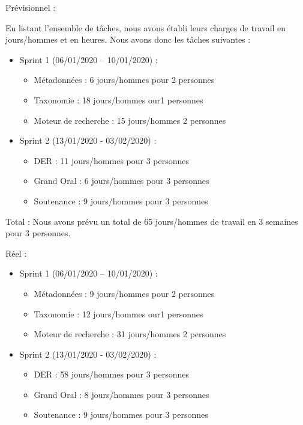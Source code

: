 Prévisionnel : 

En listant l’ensemble de tâches, nous avons établi leurs charges de travail en jours/hommes et en heures. 
Nous avons donc les tâches suivantes : 

\begin{itemize}
    \item Sprint 1 (06/01/2020 – 10/01/2020) :
        \begin{itemize}
            \item Métadonnées : 6 jours/hommes pour 2 personnes
            \item Taxonomie : 18 jours/hommes our1 personnes
            \item Moteur de recherche : 15 jours/hommes 2 personnes
        \end{itemize}
    \item Sprint 2 (13/01/2020 - 03/02/2020) :
    \begin{itemize}
        \item DER : 11 jours/hommes pour 3 personnes
        \item Grand Oral : 6 jours/hommes pour 3 personnes
        \item Soutenance :  9 jours/hommes pour 3 personnes
    \end{itemize}
\end{itemize} 

Total :  Nous avons prévu un total de 65 jours/hommes de travail en 3 semaines pour 3 personnes.


Réel : 

\begin{itemize}
    \item Sprint 1 (06/01/2020 – 10/01/2020) :
        \begin{itemize}
            \item Métadonnées : 9 jours/hommes pour 2 personnes
            \item Taxonomie : 12 jours/hommes our1 personnes
            \item Moteur de recherche : 31 jours/hommes 2 personnes
        \end{itemize}
    \item Sprint 2 (13/01/2020 - 03/02/2020) :
    \begin{itemize}
        \item DER : 58 jours/hommes pour 3 personnes
        \item Grand Oral : 8 jours/hommes pour 3 personnes
        \item Soutenance :  9 jours/hommes pour 3 personnes
    \end{itemize}
\end{itemize} 

